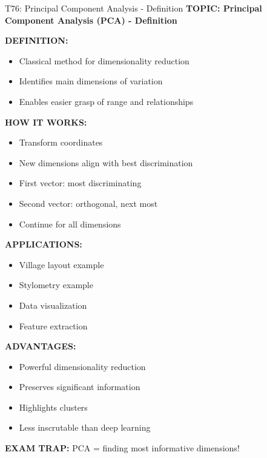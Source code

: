 \documentclass[8pt]{beamer}
\begin{document}
	\begin{frame}{T76: Principal Component Analysis - Definition}
		\fontsize{6.5}{7.5}\selectfont
		\textbf{TOPIC: Principal Component Analysis (PCA) - Definition}
		
		\vspace{0.1cm}
		\textbf{DEFINITION:}
		\begin{itemize}
			\item Classical method for dimensionality reduction
			\item Identifies main dimensions of variation
			\item Enables easier grasp of range and relationships
		\end{itemize}
		
		\vspace{0.1cm}
		\textbf{HOW IT WORKS:}
		\begin{itemize}
			\item Transform coordinates
			\item New dimensions align with best discrimination
			\item First vector: most discriminating
			\item Second vector: orthogonal, next most
			\item Continue for all dimensions
		\end{itemize}
		
		\vspace{0.1cm}
		\textbf{APPLICATIONS:}
		\begin{itemize}
			\item Village layout example
			\item Stylometry example
			\item Data visualization
			\item Feature extraction
		\end{itemize}
		
		\vspace{0.1cm}
		\textbf{ADVANTAGES:}
		\begin{itemize}
			\item Powerful dimensionality reduction
			\item Preserves significant information
			\item Highlights clusters
			\item Less inscrutable than deep learning
		\end{itemize}
		
		\textcolor{myred}{\textbf{EXAM TRAP:}} PCA = \textcolor{myblue}{finding most informative dimensions}!
	\end{frame}
	
\end{document}
